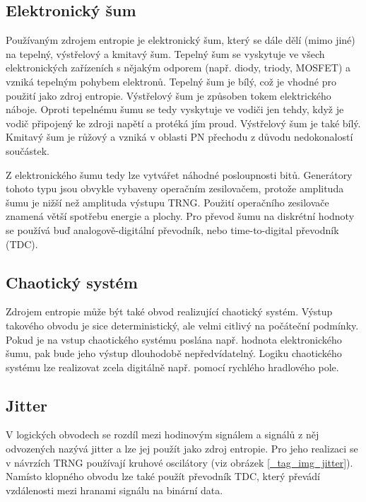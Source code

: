 \documentclass[a4paper,12pt]{article}
\begin{document}
	\subsection{Elektronický šum}
	
	Používaným zdrojem entropie je elektronický šum, který se dále dělí (mimo jiné) na tepelný, výstřelový a kmitavý šum. Tepelný šum se vyskytuje ve všech elektronických zařízeních s nějakým odporem (např. diody, triody, MOSFET) a vzniká tepelným pohybem elektronů. Tepelný šum je bílý, což je vhodné pro použití jako zdroj entropie.	Výstřelový šum je způsoben tokem elektrického náboje. Oproti tepelnému šumu se tedy vyskytuje ve vodiči jen tehdy, když je vodič připojený ke zdroji napětí a protéká jím proud. Výstřelový šum je také bílý. Kmitavý šum je růžový a vzniká v oblasti PN přechodu z důvodu nedokonalostí součástek.
	
	Z elektronického šumu tedy lze vytvářet náhodné posloupnosti bitů. Generátory tohoto typu jsou obvykle vybaveny operačním zesilovačem, protože amplituda šumu je nižší než amplituda výstupu TRNG. Použití operačního zesilovače znamená větší spotřebu energie a plochy. Pro převod šumu na diskrétní hodnoty se používá buď analogově-digitální převodník, nebo time-to-digital převodník (TDC).
	
	\subsection{Chaotický systém}
	
	Zdrojem entropie může být také obvod realizující chaotický systém. Výstup takového obvodu je sice deterministický, ale velmi citlivý na počáteční podmínky. Pokud je na vstup chaotického systému poslána např. hodnota elektronického šumu, pak bude jeho výstup dlouhodobě nepředvídatelný. Logiku chaotického systému lze realizovat zcela digitálně např. pomocí rychlého hradlového pole.
	
	\subsection{Jitter}
	
	V logických obvodech se rozdíl mezi hodinovým signálem a signálů z něj odvozených nazývá jitter a lze jej použít jako zdroj entropie. Pro jeho realizaci se v návrzích TRNG používají kruhové oscilátory (viz obrázek \ref{_tag_img_jitter}). Namísto klopného obvodu lze také použít převodník TDC, který převádí vzdálenosti mezi hranami signálu na binární data.
	
\end{document}
